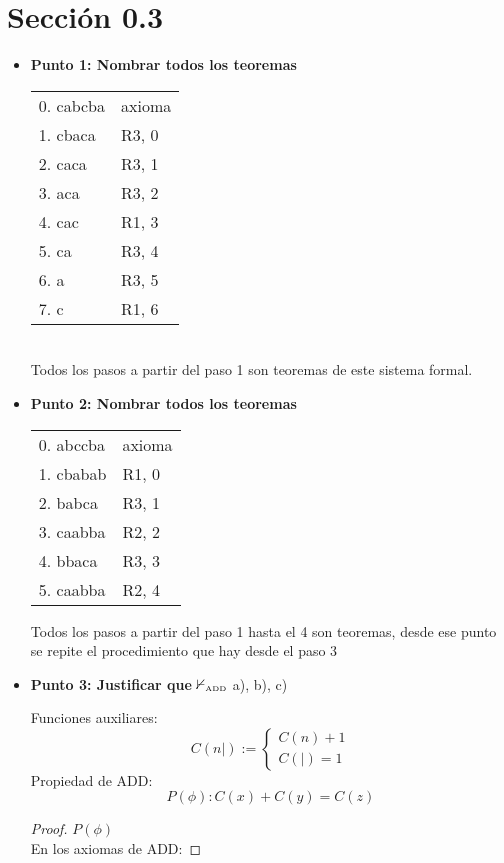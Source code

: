 \documentclass{article}
\begin{document}
\section{Sección 0.3}
\begin{itemize}
	\item[] \textbf{Punto 1: Nombrar todos los teoremas}
		\begin{center}
			\begin{NiceTabular}{l l}
				0. cabcba & axioma \\
				1. cbaca  & R3, 0  \\
				2. caca   & R3, 1  \\
				3. aca    & R3, 2  \\
				4. cac    & R1, 3  \\
				5. ca     & R3, 4  \\
				6. a      & R3, 5  \\
				7. c      & R1, 6
			\end{NiceTabular}
		\end{center}\ \\
		Todos los pasos a partir del paso 1 son teoremas de este sistema formal.
	\item[] \textbf{Punto 2: Nombrar todos los teoremas}
		\begin{center}
			\begin{NiceTabular}{l l}
				0. abccba & axioma \\
				1. cbabab & R1, 0  \\
				2. babca  & R3, 1  \\
				3. caabba & R2, 2  \\
				4. bbaca  & R3, 3  \\
				5. caabba & R2, 4
			\end{NiceTabular}
		\end{center}
		Todos los pasos a partir del paso 1 hasta el 4 son teoremas, desde ese punto se repite el procedimiento que hay desde el paso 3
	\item[] \textbf{Punto 3: Justificar que} $\nvdash_{\textrm{\tiny{ADD}}}$ a), b), c)

		Funciones auxiliares:
		\begin{equation*}
			C(n|) :=
			\begin{cases}
				C(n) + 1 \\
				C(|) = 1
			\end{cases}
		\end{equation*}
		Propiedad de ADD:
		\[P(\phi) : C(x) + C(y) = C(z)\]
		\begin{proof} $P(\phi)$\\
			En los axiomas de ADD:


\end{proof}
\end{itemize}
\end{document}
